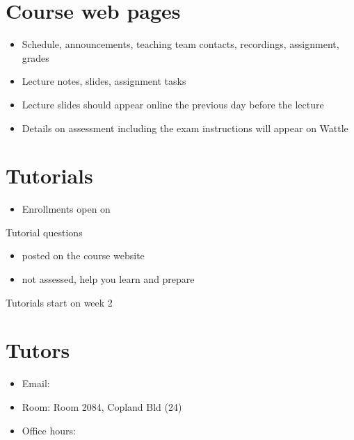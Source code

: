 \documentclass[letterpaper,10pt,english]{jupyterBook}
\begin{document}
\section{Course web pages}
\label{\detokenize{01.introduction:course-web-pages}}\begin{itemize}
\item {} 
\sphinxAtStartPar
{}
Schedule, announcements, teaching team contacts, recordings, assignment, grades

\item {} 
\sphinxAtStartPar
{}
Lecture notes, slides, assignment tasks

\item {} 
\sphinxAtStartPar
Lecture slides should appear online the previous day before the lecture

\item {} 
\sphinxAtStartPar
Details on assessment including the exam instructions will appear on Wattle

\end{itemize}


\section{Tutorials}
\label{\detokenize{01.introduction:tutorials}}\begin{itemize}
\item {} 
\sphinxAtStartPar
Enrollments open on 

\end{itemize}

\sphinxAtStartPar
Tutorial questions
\begin{itemize}
\item {} 
\sphinxAtStartPar
posted on the course website

\item {} 
\sphinxAtStartPar
not assessed, help you learn and prepare

\end{itemize}

\sphinxAtStartPar
Tutorials start on week 2


\section{Tutors}
\label{\detokenize{01.introduction:tutors}}
\sphinxAtStartPar
{}
\begin{itemize}
\item {} 
\sphinxAtStartPar
Email: 

\item {} 
\sphinxAtStartPar
Room: Room 2084, Copland Bld (24)

\item {} 
\sphinxAtStartPar
Office hours: 

\end{itemize}
\end{document}
